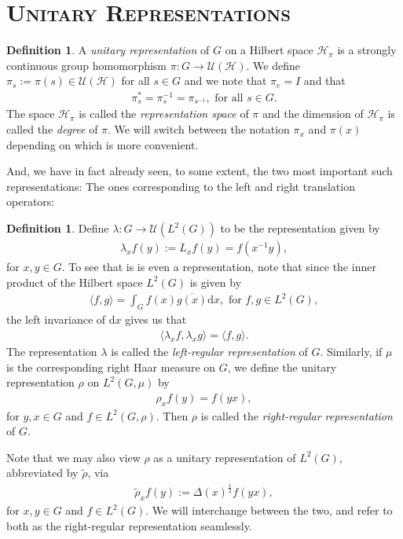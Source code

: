 \documentclass[10pt,twoside,openany,final]{memoir}
\newcommand{\sssection}[1]{%
\section[#1]{\centering\normalfont\scshape \textbf{#1}}}
\theoremstyle{definition}
\newtheorem{definition}[theorem]{Definition}
\theoremstyle{Break}
\newcommand{\U}{\mathcal{U}}
\renewcommand{\H}{\mathcal{H}}
\renewcommand{\d}{\mathrm{d}}
\begin{document}
\sssection{Unitary Representations}
\begin{definition}
A \emph{unitary representation} of $G$ on a Hilbert space $\H_\pi$ is a strongly continuous group homomorphism $\pi \colon G \to \mathcal{U}(\H)$. We define $\pi_{s}:=\pi(s) \in \U(\H)$ for all $s \in G$ and we note that $\pi_{e}=I$ and that
\begin{align*}
\pi_s^*=\pi_s^{-1}=\pi_{s^{-1}}, \text{ for all } s \in G.
\end{align*} 
The space $\H_\pi$ is called the \emph{representation space} of $\pi$ and the dimension of $\H_\pi$ is called the \emph{degree} of $\pi$. We will switch between the notation $\pi_x$ and $\pi(x)$
 depending on which is more convenient.
\end{definition}
And, we have in fact already seen, to some extent, the two most important such representations: The ones corresponding to the left and right translation operators:
\begin{definition}
Define $\lambda \colon G \to \U(L^2(G))$ to be the representation given by
\begin{align*}
	\lambda_x f(y):=L_xf(y)=f(x^{-1}y), 
\end{align*}
for $x,y \in G$. To see that is is even a representation, note that since the inner product of the Hilbert space $L^2(G)$ is given by
\begin{align*}
	\langle f,g \rangle=\int_G f(x) \overline{g(x)} \d x, \text{ for } f,g \in L^2(G),
\end{align*}
the left invariance of $\d x$ gives us that
\begin{align*}
	\langle \lambda_x f, \lambda_x g \rangle = \langle f,g \rangle.
\end{align*}	
The representation $\lambda$ is called the \emph{left-regular representation} of $G$. Similarly, if $\mu$ is the corresponding right Haar measure on $G$, we define the unitary representation $\rho$ on $L^2(G,\mu)$ by
\begin{align*}
	\rho_x f(y)=f(yx),
\end{align*}
for $y,x \in G$ and $f \in L^2(G,\rho)$. Then $\rho$ is called the \emph{right-regular representation} of $G$.
\end{definition}
Note that we may also view $\rho$ as a unitary representation of $L^2(G)$, abbreviated by $\tilde{\rho}$, via
\begin{align*}
\tilde{\rho}_xf(y):=\Delta(x)^{\frac{1}{2}} f(yx),
\end{align*}
for $x,y \in G$ and $f \in L^2(G)$. We will interchange between the two, and refer to both as the right-regular representation seamlessly.
\end{document}
